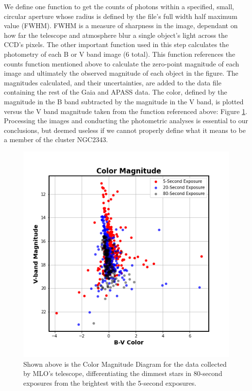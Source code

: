 \documentclass[linenumbers]{aastex631}
\begin{document}
We define one function to get the counts of photons within a specified, small, circular aperture whose radius is defined by the file's full width half maximum value (FWHM). FWHM is a measure of sharpness in the image, dependant on how far the telescope and atmosphere blur a single object's light across the CCD's pixels. The other important function used in this step calculates the photometry of each B or V band image (6 total). This function references the counts function mentioned above to calculate the zero-point magnitude of each image and ultimately the observed magnitude of each object in the figure. The magnitudes calculated, and their uncertainties, are added to the data file containing the rest of the Gaia and APASS data. The color, defined by the magnitude in the B band subtracted by the magnitude in the V band, is plotted versus the V band magnitude taken from the function referenced above: Figure \ref{fig:CMD}. Processing the images and conducting the photometric analyses is essential to our conclusions, but deemed useless if we cannot properly define what it means to be a member of the cluster NGC2343. 
\begin{figure}
    \centering
    \includegraphics[scale = 0.5]{pngs/CMD_5_20_80.png}
    \caption{\label{fig:CMD} Shown above is the Color Magnitude Diagram for the data collected by MLO's telescope, differentiating the dimmest stars in 80-second exposures from the brightest with the 5-second exposures.}
    \label{fig:CMD}
\end{figure}
\end{document}
